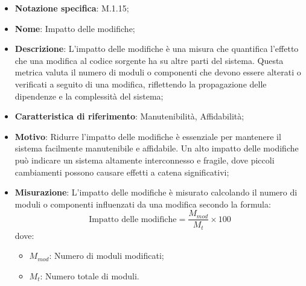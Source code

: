 \begin{itemize}
    \item \textbf{Notazione specifica}: M.1.15;
    \item \textbf{Nome}: Impatto delle modifiche;
    \item \textbf{Descrizione}: L'impatto delle modifiche è una misura che quantifica l'effetto che una modifica al codice sorgente ha su altre parti del sistema. Questa metrica valuta il numero di moduli o componenti che devono essere alterati o verificati a seguito di una modifica, riflettendo la propagazione delle dipendenze e la complessità del sistema;
    \item \textbf{Caratteristica di riferimento}: Manutenibilità, Affidabilità;
    \item \textbf{Motivo}: Ridurre l'impatto delle modifiche è essenziale per mantenere il sistema facilmente manutenibile e affidabile. Un alto impatto delle modifiche può indicare un sistema altamente interconnesso e fragile, dove piccoli cambiamenti possono causare effetti a catena significativi;
    \item \textbf{Misurazione}: L'impatto delle modifiche è misurato calcolando il numero di moduli o componenti influenzati da una modifica secondo la formula: 
    \[
    \text{Impatto delle modifiche} = \frac{M_{mod}}{M_{t}} \times 100
    \]
    dove:
    \begin{itemize}
        \item $M_{mod}$: Numero di moduli modificati;
        \item $M_{t}$: Numero totale di moduli.
    \end{itemize}
    
\end{itemize}
